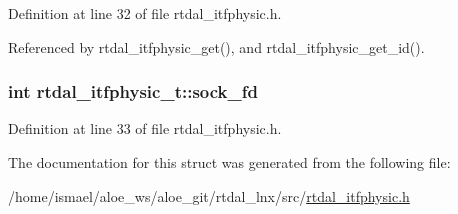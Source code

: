 Definition at line 32 of file rtdal\-\_\-itfphysic.\-h.



Referenced by rtdal\-\_\-itfphysic\-\_\-get(), and rtdal\-\_\-itfphysic\-\_\-get\-\_\-id().

\hypertarget{structrtdal__itfphysic__t_a317608cf9f44fca72c5488b37472c0e7}{
\subsubsection[{sock\-\_\-fd}]{\setlength{\rightskip}{0pt plus 5cm}int rtdal\-\_\-itfphysic\-\_\-t\-::sock\-\_\-fd}}\label{structrtdal__itfphysic__t_a317608cf9f44fca72c5488b37472c0e7}


Definition at line 33 of file rtdal\-\_\-itfphysic.\-h.



The documentation for this struct was generated from the following file\-:\begin{DoxyCompactItemize}
\item 
/home/ismael/aloe\-\_\-ws/aloe\-\_\-git/rtdal\-\_\-lnx/src/\hyperlink{rtdal__itfphysic_8h}{rtdal\-\_\-itfphysic.\-h}\end{DoxyCompactItemize}

